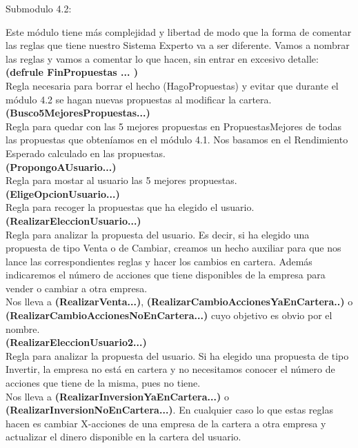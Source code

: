 \documentclass[12pt]{article}
\begin{document}
\begin{center}
	Submodulo 4.2:
\end{center}
Este módulo tiene más complejidad y libertad de modo que la forma de comentar las reglas que tiene nuestro Sistema Experto va a ser diferente. Vamos a nombrar las reglas y vamos a comentar lo que hacen, sin entrar en excesivo detalle:\\

\textbf{(defrule FinPropuestas ... )}\\
Regla necesaria para borrar el hecho (HagoPropuestas) y evitar que durante el módulo 4.2 se hagan nuevas propuestas al modificar la cartera. \\

\textbf{(Busco5MejoresPropuestas...)}\\
Regla para quedar con las 5 mejores propuestas en PropuestasMejores de todas las propuestas que obteníamos en el módulo 4.1. Nos basamos en el Rendimiento Esperado calculado en las propuestas.\\

\textbf{(PropongoAUsuario...)}\\
Regla para mostar al usuario las 5 mejores propuestas.\\

\textbf{(EligeOpcionUsuario...)}\\
Regla para recoger la propuestas que ha elegido el usuario.\\

\textbf{(RealizarEleccionUsuario...)}\\
Regla para analizar la propuesta del usuario. Es decir, si ha elegido una propuesta de tipo Venta o de Cambiar, creamos un hecho auxiliar para que nos lance las correspondientes reglas y hacer los cambios en cartera.  Además indicaremos el número de acciones que tiene disponibles de la empresa para vender o cambiar a otra empresa. \\
Nos lleva a \textbf{(RealizarVenta...)}, \textbf{(RealizarCambioAccionesYaEnCartera..)} o \textbf{(RealizarCambioAccionesNoEnCartera...)} cuyo objetivo es obvio por el nombre.\\

\textbf{(RealizarEleccionUsuario2...)}\\
Regla para analizar la propuesta del usuario. Si ha elegido una propuesta de tipo Invertir, la empresa no está en cartera y no necesitamos conocer el número de acciones que tiene de la misma, pues no tiene.\\
Nos lleva a \textbf{(RealizarInversionYaEnCartera...)} o \textbf{(RealizarInversionNoEnCartera...)}. En cualquier caso lo que estas reglas hacen es cambiar X-acciones de una empresa de la cartera a otra empresa y actualizar el dinero disponible en la cartera del usuario. \\
\end{document}
